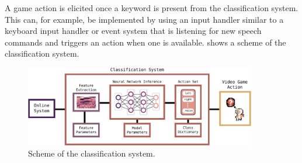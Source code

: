 A game action is elicited once a keyword is present from the classification system.
This can, for example, be implemented by using an input handler similar to a keyboard input handler or event system that is listening for new speech commands and triggers an action when one is available.
 shows a scheme of the classification system.
\begin{figure}[!ht]
  \centering
  \includegraphics[width=0.9\textwidth]{./6_game/figs/game_system_classification.pdf}
  \caption{Scheme of the classification system.}
  \label{fig:game_system_classification}
\end{figure}
\FloatBarrier
\noindent

